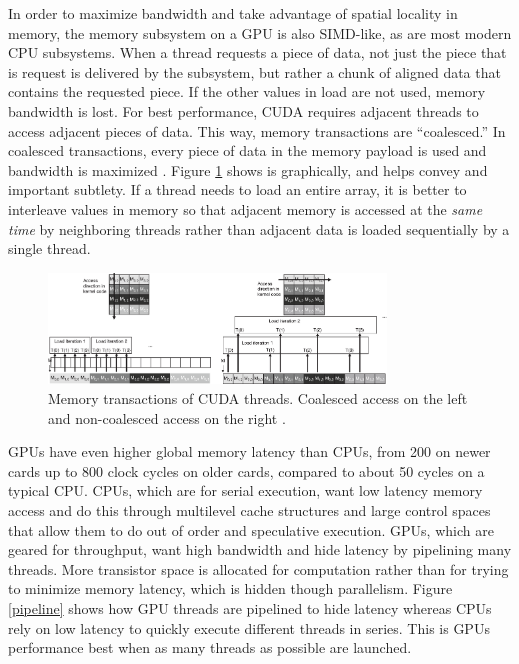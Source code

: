 In order to maximize bandwidth and take advantage of spatial locality in memory, the memory subsystem on a GPU is also SIMD-like, as are most modern CPU subsystems.  When a thread requests a piece of data, not just the piece that is request is delivered by the subsystem, but rather a chunk of aligned data that contains the requested piece.  If the other values in load are not used, memory bandwidth is lost.  For best performance, CUDA requires adjacent threads to access adjacent pieces of data.  This way, memory transactions are ``coalesced.''   In coalesced transactions, every piece of data in the memory payload is used and bandwidth is maximized \cite{cuda}.  Figure \ref{coalesced} shows is graphically, and helps convey and important subtlety.  If a thread needs to load an entire array, it is better to interleave values in memory so that adjacent memory is accessed at the \emph{same time} by neighboring threads rather than adjacent data is loaded sequentially by a single thread.

\begin{figure}[h!] 
  \centering
    \includegraphics[width=0.8\textwidth]{graphics/coalesced.eps}
     \caption{Memory transactions of CUDA threads.  Coalesced access on the left and non-coalesced access on the right \cite{programming_massively}. \label{coalesced}}
\end{figure}

GPUs have even higher global memory latency than CPUs, from 200 on newer cards up to 800 clock cycles on older cards, compared to about 50 cycles on a typical CPU.  CPUs, which are for serial execution, want low latency memory access and do this through multilevel cache structures and large control spaces that allow them to do out of order and speculative execution.  GPUs, which are geared for throughput, want high bandwidth and hide latency by pipelining many threads.  More transistor space is allocated for computation rather than for trying to minimize memory latency, which is hidden though parallelism.  Figure \ref{pipeline} shows how GPU threads are pipelined to hide latency whereas CPUs rely on low latency to quickly execute different threads in series.  This is GPUs performance best when as many threads as possible are launched.

